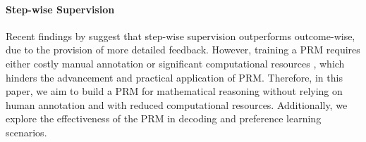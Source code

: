 \paragraph{Step-wise Supervision}
Recent findings by \citet{lightman2023let} suggest that step-wise supervision outperforms outcome-wise, due to the provision of more detailed feedback. 
However, training a PRM requires either costly manual annotation \cite{lightman2023let} or significant computational resources \cite{grace, mathshepherd}, which hinders the advancement and practical application of PRM.
Therefore, in this paper, we aim to build a PRM for mathematical reasoning without relying on human annotation and with reduced computational resources. 
Additionally, we explore the effectiveness of the PRM in decoding and preference learning scenarios.